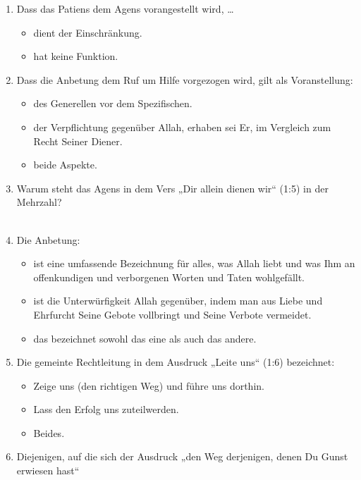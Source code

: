 \begin{enumerate}[leftmargin=1.6em]
\begin{itemize}
    \item die Vergeltung.
    \item die Taten.
    \item sowohl die Vergeltung als auch die Taten.
  \end{itemize}
\item Dass das Patiens dem Agens vorangestellt wird, \ldots
  \begin{itemize}
    \item dient der Einschränkung.
    \item hat keine Funktion.
  \end{itemize}
\item Dass die Anbetung dem Ruf um Hilfe vorgezogen wird, gilt als Voranstellung:
  \begin{itemize}
    \item des Generellen vor dem Spezifischen.
    \item der Verpflichtung gegenüber Allah, erhaben sei Er, im Vergleich zum Recht Seiner
      Diener.
    \item beide Aspekte.
  \end{itemize}
\item Warum steht das Agens in dem Vers „Dir allein dienen wir“ (1:5) in der Mehrzahl?\\
  \hrulefill\\
  \hrulefill
\item Die Anbetung:
  \begin{itemize}
    \item ist eine umfassende Bezeichnung für alles, was Allah liebt und was Ihm an
      offenkundigen und verborgenen Worten und Taten wohlgefällt.
    \item ist die Unterwürfigkeit Allah gegenüber, indem man aus Liebe und Ehrfurcht Seine
      Gebote vollbringt und Seine Verbote vermeidet.
    \item das bezeichnet sowohl das eine als auch das andere.
  \end{itemize}
\item Die gemeinte Rechtleitung in dem Ausdruck „Leite uns“ (1:6) bezeichnet:
  \begin{itemize}
    \item Zeige uns (den richtigen Weg) und führe uns dorthin.
    \item Lass den Erfolg uns zuteilwerden.
    \item Beides.
  \end{itemize}
\item Diejenigen, auf die sich der Ausdruck „den Weg derjenigen, denen Du Gunst erwiesen hast“

\end{enumerate}
